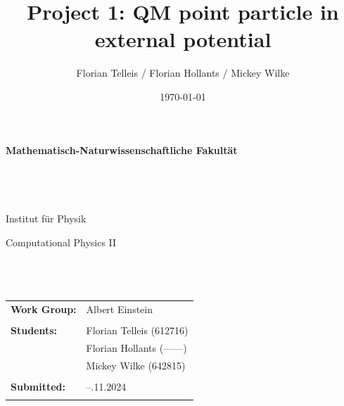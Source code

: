 \documentclass[11pt, letterpaper, onecolumn]{article}
\title{Project 1: QM point particle in external potential}
\author{Florian Telleis / Florian Hollants / Mickey Wilke}
\date{\today}
\begin{document}
	
	\begin{titlepage}
		\thispagestyle{empty}
		\begin{figure}
			
		\end{figure}
		\vspace*{-43mm}\hspace{-6mm}\textbf{\textcolor{pantone294}{\large{Mathematisch-Naturwissenschaftliche Fakultät}}}\\\\\\\\\\
		\textcolor{pantone294}{Institut für Physik}\\
		\vspace{30mm}
		\begin{center}
			\textcolor{pantone294}{\huge{Computational Physics II}}\\\vspace*{7mm}
			\textcolor{pantone294}{\huge{\textbf{\thetitle}}}\\\vspace*{10mm}
			\textcolor{pantone294}{\theauthor}\\\vspace*{10mm}
			\textcolor{pantone294}{\thedate}\\\vspace*{20mm}
			\begin{tabular}{ll}
				\textbf{Work Group:} & Albert Einstein	 \\ \\
				\textbf{Students:} & Florian Telleis (612716) \\
									& Florian Hollants (------)\\
									& Mickey  Wilke (642815)\\ \\
				\textbf{Submitted:} & --.11.2024 \\ \\				
			\end{tabular}
		\end{center}
	\end{titlepage}
	\makeatother
	\restoregeometry
		
		\newpage
	
	
	
	
	
	
    \tableofcontents
    \vspace{1cm}
    
\end{document}
